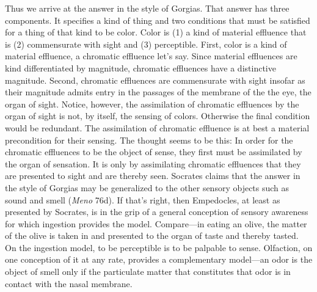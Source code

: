 \documentclass[12pt]{article}
\begin{document}
Thus we arrive at the answer in the style of Gorgias. That answer has three components. It specifies a kind of thing and two conditions that must be satisfied for a thing of that kind to be color. Color is (1) a kind of material effluence that is (2) commensurate with sight and (3) perceptible. First, color is a kind of material effluence, a chromatic effluence let's say. Since material effluences are kind differentiated by magnitude, chromatic effluences have a distinctive magnitude. Second, chromatic effluences are commensurate with sight insofar as their magnitude admits entry in the passages of the membrane of the the eye, the organ of sight. Notice, however, the assimilation of chromatic effluences by the organ of sight is not, by itself, the sensing of colors. Otherwise the final condition would be redundant. The assimilation of chromatic effluence is at best a material precondition for their sensing. The thought seems to be this: In order for the chromatic effluences to be the object of sense, they first must be assimilated by the organ of sensation. It is only by assimilating chromatic effluences that they are presented to sight and are thereby seen. Socrates claims that the answer in the style of Gorgias may be generalized to the other sensory objects such as sound and smell (\emph{Meno} 76d). If that's right, then Empedocles, at least as presented by Socrates, is in the grip of a general conception of sensory awareness for which ingestion provides the model. Compare---in eating an olive, the matter of the olive is taken in and presented to the organ of taste and thereby tasted. On the ingestion model, to be perceptible is to be palpable to sense. Olfaction, on one conception of it at any rate, provides a complementary model---an odor is the object of smell only if the particulate matter that constitutes that odor is in contact with the nasal membrane. 
\end{document}
